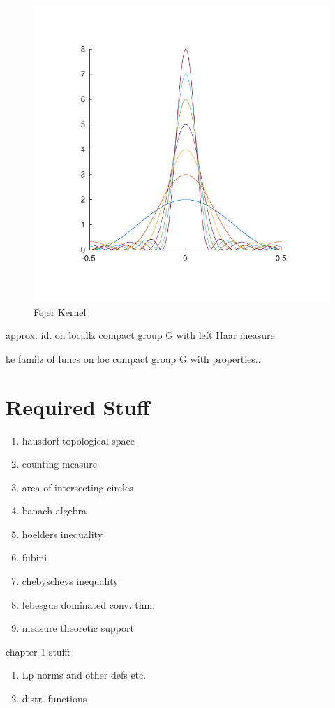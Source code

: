 \begin{example}
\begin{figure}[h!bt]
\centering
\includegraphics[width = \textwidth]{matlab/fejerkernel}
\caption{Fejer Kernel}
\label{fejer}
\end{figure}
\end{example}

\begin{theorem}
approx. id. on locallz compact group G with left Haar measure
\end{theorem}

\begin{theorem}
ke familz of funcs on loc compact group G with properties...
\end{theorem}

\section{Required Stuff}

\begin{enumerate}
\item hausdorf topological space
\item counting measure
\item area of intersecting circles
\item banach algebra
\item hoelders inequality
\item fubini
\item chebyschevs inequality
\item lebesgue dominated conv. thm.
\item measure theoretic support
\end{enumerate}

chapter 1 stuff:
\begin{enumerate}
\item Lp norms and other defs etc.
\item distr. functions
\end{enumerate}

